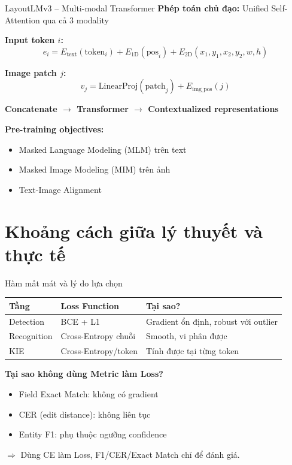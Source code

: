 \documentclass[aspectratio=169]{beamer}
\begin{document}
\begin{frame}{LayoutLMv3 -- Multi-modal Transformer}
    \textbf{Phép toán chủ đạo:} Unified Self-Attention qua cả 3 modality
    \vspace{0.3cm}

    \textbf{Input token $i$:}
    \[e_i = E_{\text{text}}(\text{token}_i) + E_{\text{1D}}(\text{pos}_i) + E_{\text{2D}}(x_1, y_1, x_2, y_2, w, h)\]

    \textbf{Image patch $j$:}
    \[v_j = \text{LinearProj}(\text{patch}_j) + E_{\text{img\_pos}}(j)\]

    \textbf{Concatenate $\rightarrow$ Transformer $\rightarrow$ Contextualized representations}
    \vspace{0.3cm}

    \textbf{Pre-training objectives:}
    \begin{itemize}
        \item Masked Language Modeling (MLM) trên text
        \item Masked Image Modeling (MIM) trên ảnh
        \item Text-Image Alignment
    \end{itemize}
\end{frame}

\section{Khoảng cách giữa lý thuyết và thực tế}

\begin{frame}{Hàm mất mát và lý do lựa chọn}
    \begin{center}
    \begin{tabular}{p{3cm}p{4cm}p{4.5cm}}
        \toprule
        \textbf{Tầng} & \textbf{Loss Function} & \textbf{Tại sao?} \\
        \midrule
        Detection & BCE + L1 & Gradient ổn định, robust với outlier \\
        \addlinespace
        Recognition & Cross-Entropy chuỗi & Smooth, vi phân được \\
        \addlinespace
        KIE & Cross-Entropy/token & Tính được tại từng token \\
        \bottomrule
    \end{tabular}
    \end{center}
    \vspace{0.4cm}

    \textbf{Tại sao không dùng Metric làm Loss?}
    \begin{itemize}
        \item Field Exact Match: không có gradient
        \item CER (edit distance): không liên tục
        \item Entity F1: phụ thuộc ngưỡng confidence
    \end{itemize}
    $\Rightarrow$ Dùng CE làm Loss, F1/CER/Exact Match chỉ để đánh giá.
\end{frame}
\end{document}
